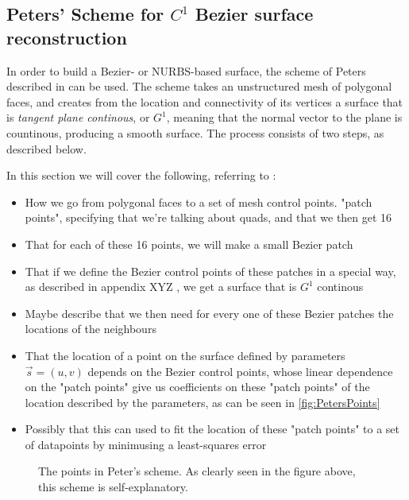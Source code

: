 \subsection{Peters' Scheme for $C^1$ Bezier surface reconstruction}
In order to build a Bezier- or NURBS-based surface, the scheme of Peters described in \cite{peters1992constructing} can be used. The scheme takes an unstructured mesh of polygonal faces, and creates from the location and connectivity of its vertices a surface that is \emph{tangent plane continous}, or $G^1$, meaning that the normal vector to the plane is countinous, producing a smooth surface. The process consists of two steps, as described below.

In this section we will cover the following, referring to \cite{peters1992constructing}:
\begin{itemize}
\item How we go from polygonal faces to a set of mesh control points. "patch points", specifying that we're talking about quads, and that we then get 16
\item That for each of these 16 points, we will make a small Bezier patch
\item That if we define the Bezier control points of these patches in a special way, as described in appendix XYZ , we get a surface that is $G^1$ continous
\item Maybe describe that we then need for every one of these Bezier patches the locations of the neighbours
\item That the location of a point on the surface defined by parameters $\vec{s} = (u,v)$ depends on the Bezier control points, whose linear dependence on the "patch points" give us coefficients on these "patch points" of the location described by the parameters, as can be seen in \autoref{fig:PetersPoints}
\item Possibly that this can used to fit the location of these "patch points" to a set of datapoints by minimusing a least-squares error 
\end{itemize}
\begin{figure}

\label{fig:PetersPoints}
\caption{The points in Peter's scheme. As clearly seen in the figure above, this scheme is self-explanatory.}
\end{figure}